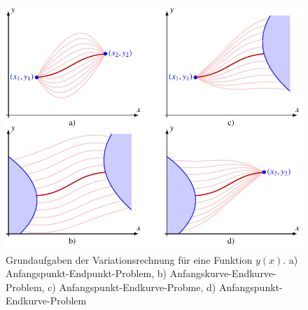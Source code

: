 %
%
%
\begin{figure}
\centering
\includegraphics{chapters/020-variation/images/grundaufgaben.pdf}
\caption{Grundaufgaben der Variationsrechnung für eine Funktion $y(x)$.
a) Anfangspunkt-Endpunkt-Problem,
%
b) Anfangskurve-Endkurve-Problem,
%
c) Anfangspunkt-Endkurve-Probme,
%
d) Anfangspunkt-Endkurve-Problem
%
\label{buch:variation:problem:fig:grundaufgaben}}
\end{figure}
